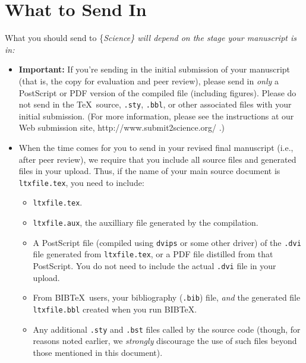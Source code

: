 \documentclass[12pt]{article}
\begin{document}
\hypertarget{what-to-send-in}{%
\section{What to Send In}\label{what-to-send-in}}

What you should send to \{\it Science\/\} will depend on the stage your
manuscript is in:

\begin{itemize}
\item {\bf Important:} If you're sending in the initial submission of
  your manuscript (that is, the copy for evaluation and peer review),
  please send in {\it only\/} a PostScript or PDF version of the
  compiled file (including figures).  Please do not send in the \TeX\ 
  source, \texttt{.sty}, \texttt{.bbl}, or other associated files with
  your initial submission.  (For more information, please see the
  instructions at our Web submission site,
  http://www.submit2science.org/ .)
\item When the time comes for you to send in your revised final
  manuscript (i.e., after peer review), we require that you include
  all source files and generated files in your upload.  Thus, if the
  name of your main source document is \texttt{ltxfile.tex}, you
  need to include:
\begin{itemize}
\item \texttt{ltxfile.tex}.
\item \texttt{ltxfile.aux}, the auxilliary file generated by the
  compilation.
\item A PostScript file (compiled using \texttt{dvips} or some other
  driver) of the \texttt{.dvi} file generated from
  \texttt{ltxfile.tex}, or a PDF file distilled from that
  PostScript.  You do not need to include the actual \texttt{.dvi}
  file in your upload.
\item From B{\small{IB}}\TeX\ users, your bibliography (\texttt{.bib})
  file, {\it and\/} the generated file \texttt{ltxfile.bbl} created
  when you run B{\small{IB}}\TeX.
\item Any additional \texttt{.sty} and \texttt{.bst} files called by
  the source code (though, for reasons noted earlier, we {\it
    strongly\/} discourage the use of such files beyond those
  mentioned in this document).
\end{itemize}
\end{itemize}



\end{document}
